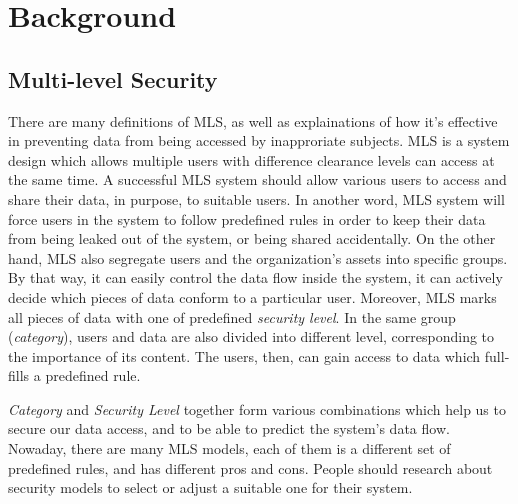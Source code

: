 
\chapter{Background} %

\label{ch:background} %


\section{Multi-level Security}

There are many definitions of MLS, as well as explainations of how it's effective in preventing data from being accessed by inapproriate subjects.
MLS is a system design which allows multiple users with difference clearance levels can access at the same time.
A successful MLS system should allow various users to access and share their data, in purpose, to suitable users. 
In another word, MLS system will force users in the system to follow predefined rules in order to keep their data from being leaked out of the system, or being shared accidentally.
On the other hand, MLS also segregate users and the organization's assets into specific groups.
By that way, it can easily control the data flow inside the system, it can actively decide which pieces of data conform to a particular user.
Moreover, MLS marks all pieces of data with one of predefined \emph{security level}.
In the same group (\emph{category}), users and data are also divided into different level, corresponding to the importance of its content.
The users, then, can gain access to data which full-fills a predefined rule.

\emph{Category} and \emph{Security Level} together form various combinations which help us to secure our data access, and to be able to predict the system's data flow.
Nowaday, there are many MLS models, each of them is a different set of predefined rules, and has different pros and cons.
People should research about security models to select or adjust a suitable one for their system.



